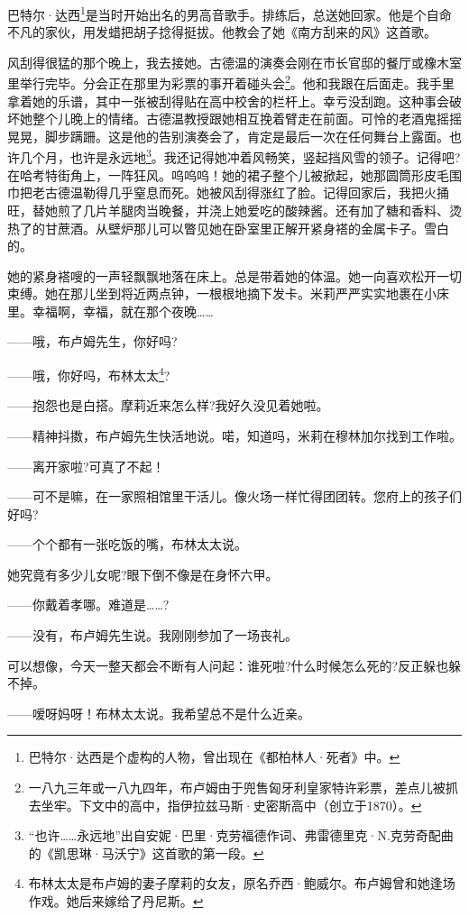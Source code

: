 \par 巴特尔·达西\footnote{巴特尔·达西是个虚构的人物，曾出现在《都柏林人·死者》中。}是当时开始出名的男高音歌手。排练后，总送她回家。他是个自命不凡的家伙，用发蜡把胡子捻得挺拔。他教会了她《南方刮来的风》这首歌。
\par 风刮得很猛的那个晚上，我去接她。古德温的演奏会刚在市长官邸的餐厅或橡木室里举行完毕。分会正在那里为彩票的事开着碰头会\footnote{一八九三年或一八九四年，布卢姆由于兜售匈牙利皇家特许彩票，差点儿被抓去坐牢。下文中的高中，指伊拉兹马斯·史密斯高中（创立于1870）。}。他和我跟在后面走。我手里拿着她的乐谱，其中一张被刮得贴在高中校舍的栏杆上。幸亏没刮跑。这种事会破坏她整个儿晚上的情绪。古德温教授跟她相互挽着臂走在前面。可怜的老酒鬼摇摇晃晃，脚步蹒跚。这是他的告别演奏会了，肯定是最后一次在任何舞台上露面。也许几个月，也许是永远地\footnote{“也许……永远地”出自安妮·巴里·克劳福德作词、弗雷德里克·N.克劳奇配曲的《凯思琳·马沃宁》这首歌的第一段。}。我还记得她冲着风畅笑，竖起挡风雪的领子。记得吧?在哈考特街角上，一阵狂风。呜呜呜！她的裙子整个儿被掀起，她那圆筒形皮毛围巾把老古德温勒得几乎窒息而死。她被风刮得涨红了脸。记得回家后，我把火捅旺，替她煎了几片羊腿肉当晚餐，并浇上她爱吃的酸辣酱。还有加了糖和香料、烫热了的甘蔗酒。从壁炉那儿可以瞥见她在卧室里正解开紧身褡的金属卡子。雪白的。
\par 她的紧身褡嗖的一声轻飘飘地落在床上。总是带着她的体温。她一向喜欢松开一切束缚。她在那儿坐到将近两点钟，一根根地摘下发卡。米莉严严实实地裹在小床里。幸福啊，幸福，就在那个夜晚……
\par ——哦，布卢姆先生，你好吗?
\par ——哦，你好吗，布林太太\footnote{布林太太是布卢姆的妻子摩莉的女友，原名乔西·鲍威尔。布卢姆曾和她逢场作戏。她后来嫁给了丹尼斯。}?
\par ——抱怨也是白搭。摩莉近来怎么样?我好久没见着她啦。
\par ——精神抖擞，布卢姆先生快活地说。喏，知道吗，米莉在穆林加尔找到工作啦。
\par ——离开家啦?可真了不起！
\par ——可不是嘛，在一家照相馆里干活儿。像火场一样忙得团团转。您府上的孩子们好吗?
\par ——个个都有一张吃饭的嘴，布林太太说。
\par 她究竟有多少儿女呢?眼下倒不像是在身怀六甲。
\par ——你戴着孝哪。难道是……?
\par ——没有，布卢姆先生说。我刚刚参加了一场丧礼。
\par 可以想像，今天一整天都会不断有人问起：谁死啦?什么时候怎么死的?反正躲也躲不掉。
\par ——嗳呀妈呀！布林太太说。我希望总不是什么近亲。
